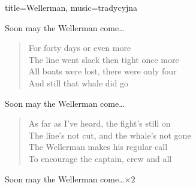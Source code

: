 \begin{song}{title={Wellerman}, music={tradycyjna}}
\begin{multicols}{2}
\begin{verse}
    \end{verse}
    \begin{chorus}
        Soon may the Wellerman come\ldots
    \end{chorus}
    \begin{verse}
        For forty days or even more \\
        The line went slack then tight once more \\
        All boats were lost, there were only four \\
        And still that whale did go
    \end{verse}
    \begin{chorus}
        Soon may the Wellerman come\ldots
    \end{chorus}
    \begin{verse}
        As far as I've heard, the fight's still on \\
        The line's not cut, and the whale's not gone \\
        The Wellerman makes his regular call \\
        To encourage the captain, crew and all
    \end{verse}
    \begin{chorus}
        Soon may the Wellerman come\ldots $\times 2$
    \end{chorus}
\end{multicols}
\end{song}

